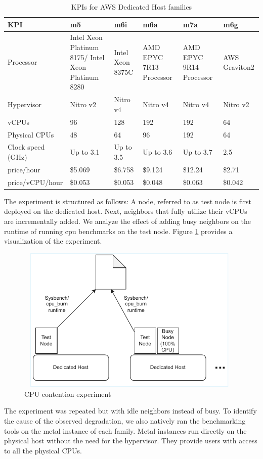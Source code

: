 \renewcommand{\arraystretch}{1.5} %
\begin{table}[h]
\centering
\small
\begin{tabular}{|l|p{1.5cm}|p{1.5cm}|p{1.5cm}|p{1.5cm}|p{1.5cm}|}
\hline
KPI & m5 & m6i & m6a & m7a & m6g \\
\hline
Processor \cite{cloudspecs} & Intel Xeon Platinum 8175/ Intel Xeon Platinum 8280	 & Intel Xeon 8375C & AMD EPYC 7R13 Processor & AMD EPYC 9R14 Processor & AWS Graviton2 \\
\hline
Hypervisor \cite{awsEC2GP2025} & Nitro v2 & Nitro v4 & Nitro v4 & Nitro v4 & Nitro v2\\
\hline
vCPUs \cite{pricing} & 96 & 128 & 192 & 192 & 64 \\
\hline
Physical CPUs \cite{pricing} & 48 & 64 & 96 & 192 & 64 \\
\hline
Clock speed (GHz) \cite{vantage} & Up to 3.1 & Up to 3.5 & Up to 3.6 & Up to 3.7 & 2.5\\
\hline
price/hour \cite{pricing} & \$5.069 & \$6.758 & \$9.124 & \$12.24 & \$2.71 \\
\hline
price/vCPU/hour & \$0.053 & \$0.053 & \$0.048 & \$0.063 & \$0.042 \\
\hline
\end{tabular}
\caption{KPIs for AWS Dedicated Host families}
\label{tab:dedicated-hosts}
\end{table}
\noindent
The experiment is structured as follows: A node, referred to as test node 
is first deployed on the dedicated host. Next, neighbors that fully utilize their vCPUs are 
incrementally added. We analyze the effect of adding busy neighbors on the runtime of running 
cpu benchmarks on the test node.
Figure \ref{fig:cpu_exp} provides a visualization of the experiment. 
\begin{figure}[H]
  \centering
  \includegraphics[width=11cm, height=7cm]{figures/cpu_exp}
  \caption{CPU contention experiment}
  \label{fig:cpu_exp}
\end{figure}
\noindent
The experiment was repeated but with idle neighbors instead of busy. To identify the cause of the 
observed degradation, we also natively ran the benchmarking tools on the metal 
instance of each family. Metal instances run directly on the physical host without the need 
for the hypervisor. They provide users with access to all the physical 
CPUs.
